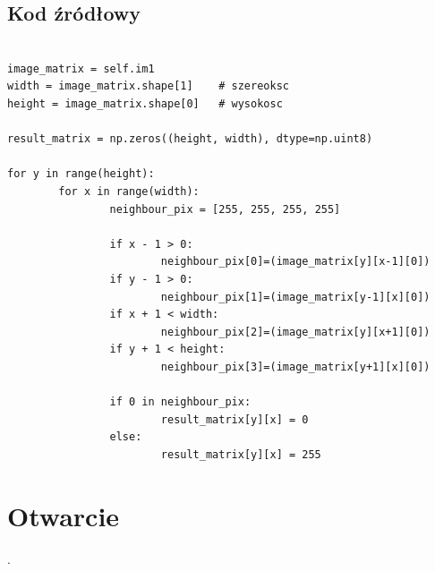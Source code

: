 \documentclass[final,a4paper,openany,12pt]{mwbk}
\begin{document}
\subsection*{Kod źródłowy}

\begin{lstlisting}[caption= Operacja nakładania (dylatacji) na obrazie binarnym]

image_matrix = self.im1
width = image_matrix.shape[1]    # szereoksc
height = image_matrix.shape[0]   # wysokosc

result_matrix = np.zeros((height, width), dtype=np.uint8)

for y in range(height):
        for x in range(width):  
                neighbour_pix = [255, 255, 255, 255]

                if x - 1 > 0:
                        neighbour_pix[0]=(image_matrix[y][x-1][0])
                if y - 1 > 0:
                        neighbour_pix[1]=(image_matrix[y-1][x][0])
                if x + 1 < width:
                        neighbour_pix[2]=(image_matrix[y][x+1][0])
                if y + 1 < height:
                        neighbour_pix[3]=(image_matrix[y+1][x][0])

                if 0 in neighbour_pix:
                        result_matrix[y][x] = 0
                else:
                        result_matrix[y][x] = 255          

\end{lstlisting}

\section{ Otwarcie}
.
\hfill
\\\\
\indent
\end{document}
